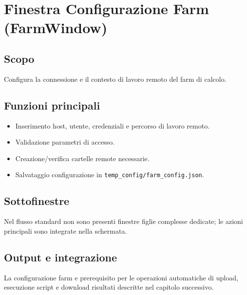 \chapter{Finestra Configurazione Farm (FarmWindow)}

\section{Scopo}
Configura la connessione e il contesto di lavoro remoto del farm di calcolo.

\section{Funzioni principali}
\begin{itemize}[leftmargin=1.5em]
  \item Inserimento host, utente, credenziali e percorso di lavoro remoto.
  \item Validazione parametri di accesso.
  \item Creazione/verifica cartelle remote necessarie.
  \item Salvataggio configurazione in \texttt{temp\_config/farm\_config.json}.
\end{itemize}

\section{Sottofinestre}
Nel flusso standard non sono presenti finestre figlie complesse dedicate; le azioni principali sono integrate nella schermata.

\section{Output e integrazione}
La configurazione farm e prerequisito per le operazioni automatiche di upload, esecuzione script e download risultati descritte nel capitolo successivo.
